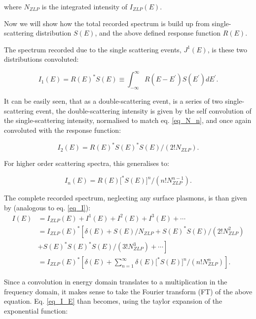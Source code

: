 where $N_{ZLP}$ is the integrated intensity of $I_{ZLP}(E)$. 


Now we will show how the total recorded spectrum is build up from single-scattering distribution $S(E)$, and the above defined response function $R(E)$. 


The spectrum recorded due to the single scattering events, $J^1(E)$, is these two distributions convoluted:

\begin{equation} \label{eq_I_1}
    I_{1}(E)=R(E)^{*} S(E) \equiv \int_{-\infty}^{\infty} R\left(E-E^{\prime}\right) S\left(E^{\prime}\right) d E^{\prime}.
\end{equation}


It can be easily seen, that as a double-scattering event, is a series of two single-scattering event, the double-scattering intensity is given by the self convolution of the single-scattering intensity, normalised to match eq. \eqref{eq_N_n}, and once again convoluted with the response function:

\begin{equation}
    I_{2}(E)=R(E)^{*} S(E)^{*} S(E) /\left(2 ! N_{ZLP}\right).
\end{equation}

For higher order scattering spectra, this generalises to:


\begin{equation} \label{eq_def_I_n}
    I_{n}(E)=R(E)\big[^{*} S(E)\big]^{n} /\left(n ! N_{ZLP}^{n-1}\right).
\end{equation}

The complete recorded spectrum, neglecting any surface plasmons, is than given by (analogous to eq. \eqref{eq_I}):
\begin{equation} \label{eq_I_E}
    \begin{aligned}
        I(E) &=I_{ZLP}(E)+I^{1}(E)+I^{2}(E)+I^{3}(E)+\cdots \\
        &=I_{ZLP}(E)^{*}\left[\delta(E)+S(E) / N_{ZLP}+S(E)^{*} S(E) /\left(2 ! N_{ZLP}^{2}\right)\right.\\
        &\left.+S(E)^{*} S(E)^{*} S(E) /\left(3 ! N_{ZLP}^{3}\right)+\cdots\right]\\
        &= I_{ZLP}(E)^{*}\left[\delta(E)+ \sum_{n=1}^\infty \delta(E)\big[^{*} S(E)\big]^{n} /\left(n ! N_{ZLP}^{n}\right) \right].
        \end{aligned}
\end{equation}

Since a convolution in energy domain translates to a multiplication in the frequency domain, it makes sense to take the Fourier transform (FT) of the above equation. Eq. \eqref{eq_I_E} than becomes, using the taylor expansion of the exponential function:

